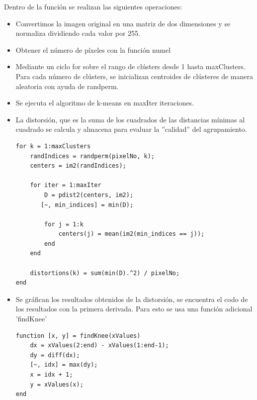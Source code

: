 \noindent Dentro de la función se realizan las siguientes operaciones:

\begin{itemize}
    \item Convertimos la imagen original en una matriz de dos dimensiones y se normaliza dividiendo cada valor por 255.
    \item Obtener el número de píxeles con la función numel
    \item Mediante un ciclo for sobre el rango de clústers desde 1 hasta maxClusters. Para cada número de clústers, se inicializan centroides de clústeres de manera aleatoria con ayuda de randperm.
    \item Se ejecuta el algoritmo de k-means en maxIter iteraciones.
    \item La distorsión, que es la suma de los cuadrados de las distancias mínimas al cuadrado se calcula y almacena para evaluar la ''calidad'' del agrupamiento.

     \begin{lstlisting}[style=Matlab-editor, caption=Fragmento del algoritmo findOptimalCluster, basicstyle=\fontsize{8}{12}\selectfont]
for k = 1:maxClusters
    randIndices = randperm(pixelNo, k);
    centers = im2(randIndices);

    for iter = 1:maxIter
        D = pdist2(centers, im2);
       [~, min_indices] = min(D);

        for j = 1:k
            centers(j) = mean(im2(min_indices == j));
        end
    end

    distortions(k) = sum(min(D).^2) / pixelNo;
end
\end{lstlisting}

    \item Se gráfican los resultados obtenidos de la distorsión, se encuentra el codo de los resultados con la primera derivada. Para esto se usa una función adicional 'findKnee'

\begin{lstlisting}[style=Matlab-editor, caption=Algoritmo findKnee, basicstyle=\fontsize{8}{12}\selectfont]
function [x, y] = findKnee(xValues)
    dx = xValues(2:end) - xValues(1:end-1);
    dy = diff(dx);
    [~, idx] = max(dy); 
    x = idx + 1;  
    y = xValues(x);
end
\end{lstlisting}

\end{itemize}


